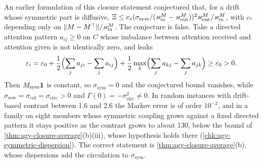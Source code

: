 \begin{example}\label{ex:agy-symmetric-dispersion}
An earlier formulation of this closure statement conjectured that, for a drift whose symmetric part is diffusive, $\Xi\le c_\ast(\sigma_{\mathrm{sym}}/(\varkappa_{\mathrm{in}}^M-\varkappa_{\mathrm{out}}^M))^2\varkappa_{\mathrm{out}}^M/\varkappa_{\mathrm{in}}^M$, with $c_\ast$ depending only on $\Vert M-M^\top\Vert/\varkappa_{\mathrm{in}}^M$. The conjecture is false. Take a directed attention pattern $a_{ij}\ge0$ on $C$ whose imbalance between attention received and attention given is not identically zero, and leaks
\begin{equation}\label{eq:agy-bad-leaks}
\varepsilon_i=\varepsilon_0+\frac12\Bigl(\sum_ja_{ji}-\sum_ja_{ij}\Bigr)+\frac12\max_k\Bigl(\sum_ja_{kj}-\sum_ja_{jk}\Bigr)\ge\varepsilon_0>0.
\end{equation}
Then $M_{\mathrm{sym}}\mathbf{1}$ is constant, so $\sigma_{\mathrm{sym}}=0$ and the conjectured bound vanishes, while $\sigma_{\mathrm{row}}=\sigma_{\mathrm{col}}=\sigma_{\mathrm{circ}}>0$ and $\Gamma(0)=-\sigma_{\mathrm{circ}}^2\ne0$. In random instances with drift-based contrast between 1.6 and 2.6 the Markov error is of order $10^{-2}$, and in a family on eight members whose symmetric coupling grows against a fixed directed pattern it stays positive as the contrast grows to about 130, below the bound of \cref{thm:agy-closure-average}(b)(iii), whose hypothesis holds there (\cref{chk:agy-symmetric-dispersion}). The correct statement is \cref{thm:agy-closure-average}(b), whose dispersions add the circulation to $\sigma_{\mathrm{sym}}$.
\end{example}

